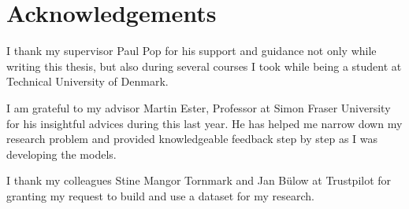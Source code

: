 \chapter{Acknowledgements}

I thank my supervisor Paul Pop for his support and guidance not only while writing this thesis, but also during several courses I took while being a student at Technical University of Denmark. 

I am grateful to my advisor Martin Ester, Professor at Simon Fraser University for his insightful advices during this last year. He has helped me narrow down my research problem and provided knowledgeable feedback step by step as I was developing the models.

I thank my colleagues Stine Mangor Tornmark and Jan Bülow at Trustpilot for granting my request to build and use a dataset for my research.


